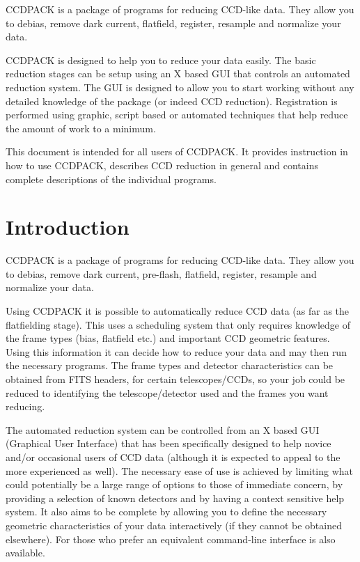 \documentclass[twoside,11pt]{article}
\newcommand{\stardocinitials}  {SUN}
\newcommand{\stardocnumber}    {139.9}
\newcommand{\stardocabstract}  {
CCDPACK is a package of programs for reducing CCD-like data. They
allow you to debias, remove dark current, flatfield, register,
resample and normalize your data.

CCDPACK is designed to help you to reduce your data easily.
The basic reduction stages can be setup using an X based GUI that
controls an automated reduction system.
The GUI is designed to allow you to start working without any
detailed knowledge of the package (or indeed CCD reduction).
Registration is performed using graphic, script based or automated
techniques that help reduce the amount of work to a minimum.

This document is intended for all users of CCDPACK.
It provides instruction in how to use CCDPACK, describes CCD reduction
in general and contains complete descriptions of the individual
programs.
}
\newcommand{\stardocname}{\stardocinitials /\stardocnumber}
\newenvironment{latexonly}{}{}
\newcommand{\xlabel}[1]{}
\renewcommand{\_}{\texttt{\symbol{95}}}
\renewcommand{\thepage}{\roman{page}}
\begin{document}
\stardocabstract
  \newpage
  \begin{latexonly}
    \setlength{\parskip}{0mm}
    \tableofcontents
    \setlength{\parskip}{\medskipamount}
    \markboth{\stardocname}{\stardocname}
  \end{latexonly}
\cleardoublepage
\renewcommand{\thepage}{\arabic{page}}
\setcounter{page}{1}

\section{\xlabel{introduction}Introduction}

CCDPACK is a package of programs for reducing CCD-like data. They
allow you to debias, remove dark current, pre-flash, flatfield,
register, resample and normalize your data.

Using CCDPACK it is possible to automatically reduce CCD data (as far
as the flatfielding stage). This uses a scheduling system that only
requires knowledge of the frame types (bias, flatfield etc.) and
important CCD geometric features.
Using this information it can decide how to reduce your data and may
then run the necessary programs.
The frame types and detector characteristics can be obtained from FITS
headers, for certain telescopes/CCDs, so your job could be reduced to
identifying the telescope/detector used and the frames you want
reducing.

The automated reduction system can be controlled from an X based GUI
(Graphical User Interface) that has been specifically designed to
help novice and/or occasional users of CCD data (although it is
expected to appeal to the more experienced as well).
The necessary ease of use is achieved by limiting what could
potentially be a large range of options to those of immediate concern,
by providing a selection of known detectors and by having a context
sensitive help system.
It also aims to be complete by allowing you to define the necessary
geometric characteristics of your data interactively (if they cannot
be obtained elsewhere).
For those who prefer an equivalent command-line interface is also
available.
\end{document}
